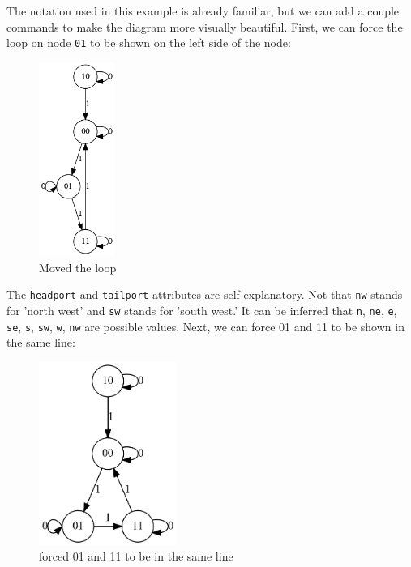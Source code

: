 \documentclass{article}
\begin{document}
	

	The notation used in this example is already familiar, but we can add a couple commands to make the diagram more visually beautiful. First, we can force the loop on node \lstinline{01} to be shown on the left side of the node:

	\begin{figure}[H]
		\begin{center}
			\includegraphics[width=25mm]{state1.1.png}
		\end{center}
		\caption{Moved the loop}
		\label{fig:state1.1}
	\end{figure}

	
	The \lstinline{headport} and \lstinline{tailport} attributes are self explanatory. Not that \lstinline{nw} stands for 'north west' and \lstinline{sw} stands for 'south west.' It can be inferred that \lstinline{n}, \lstinline{ne}, \lstinline{e}, \lstinline{se}, \lstinline{s}, \lstinline{sw}, \lstinline{w}, \lstinline{nw} are possible values.
	Next, we can force 01 and 11 to be shown in the same line:

	\begin{figure}[H]
		\begin{center}
			\includegraphics[width=45mm]{state1.2.png}
		\end{center}
		\caption{forced 01 and 11 to be in the same line}
		\label{fig:state1.2}
	\end{figure}
\end{document}
